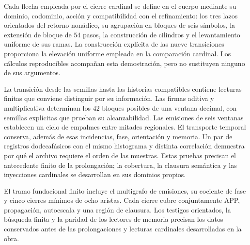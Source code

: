 Cada flecha empleada por el cierre cardinal se define en el cuerpo mediante su
dominio, codominio, acción y compatibilidad con el refinamiento: los tres lazos
orientados del retorno nonádico, su agrupación en bloques de seis símbolos, la
extensión de bloque de \(54\) pasos, la construcción de cilindros y el
levantamiento uniforme de sus ramas. La construcción explícita de las nueve
transiciones proporciona la elevación uniforme empleada en la comparación
cardinal. Los cálculos reproducibles acompañan esta demostración, pero no
sustituyen ninguno de sus argumentos.

La transición desde las semillas hasta las historias compatibles contiene
lecturas finitas que conviene distinguir por su información. Las firmas
aditiva y multiplicativa determinan los \(42\) bloques posibles de una
ventana decimal, con semillas explícitas que prueban su alcanzabilidad.
Las emisiones de seis ventanas establecen un ciclo de empalmes entre
mitades regionales. El transporte temporal conserva, además de esas
incidencias, fase, orientación y memoria. Un par de registros dodecafásicos
con el mismo histograma y distinta correlación demuestra por qué el
archivo requiere el orden de las muestras. Estas pruebas precisan el
antecedente finito de la prolongación; la cobertura, la clausura semántica
y las inyecciones cardinales se desarrollan en sus dominios propios.

El tramo fundacional finito incluye el multigrafo de emisiones, su
cociente de fase y cinco cierres mínimos de ocho aristas. Cada cierre
cubre conjuntamente APP, propagación, autoescala y una región de clausura.
Los testigos orientados, la búsqueda finita y la paridad de los lectores
de memoria precisan los datos conservados antes de las prolongaciones
y lecturas cardinales desarrolladas en la obra.
